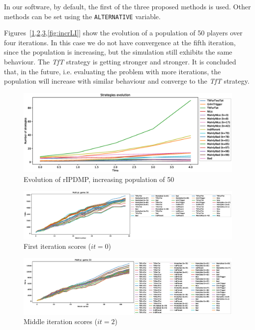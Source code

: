 \documentclass[journal,a4paper,10pt,twoside]{IEEEtran} %
\begin{document}
In our software, by default, the first of the three proposed methods is used. Other methods can be set using the \texttt{ALTERNATIVE} variable.

Figures~[\ref{fig:incrR},\ref{fig:incrFI},\ref{fig:incrMI},\ref{fig:incrLI}] show the evolution of a population of 50 players over four iterations. In this case we do not have convergence at the fifth iteration, since the population is increasing, but the simulation still exhibits the same behaviour. The \textit{TfT} strategy is getting stronger and stronger. It is concluded that, in the future, i.e. evaluating the problem with more iterations, the population will increase with similar behaviour and converge to the \textit{TfT} strategy.

\begin{figure}[!ht]
    \centering
    \includegraphics[width=1\columnwidth]{../img/ripdmp-incr/ripdmp-evolution-increasing-pop-50}
    \caption{Evolution of rIPDMP, increasing population of 50}
    \label{fig:incrR}
\end{figure}

\begin{figure}[!ht]
    \centering
    \includegraphics[width=1\columnwidth]{../img/ripdmp-incr/ripdmp-scores-increasing-pop-50-r0}
    \caption{First iteration scores ($it=0$)}
    \label{fig:incrFI}
\end{figure}

\begin{figure}[!ht]
    \centering
    \includegraphics[width=1\columnwidth]{../img/ripdmp-incr/ripdmp-scores-increasing-pop-50-r2}
    \caption{Middle iteration scores ($it=2$)}
    \label{fig:incrMI}
\end{figure}
\end{document}
